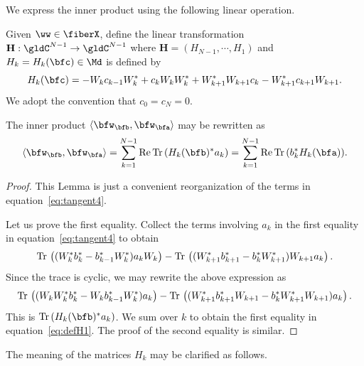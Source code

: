 We express the inner product using the following linear operation.
\begin{defn}
\label{def:H}
Given $\ww \in \fiberX$, define the linear transformation $\mathbf{H}: \gldC^{N-1} \to \gldC^{N-1}$ where $\mathbf{H} =(H_{N-1},\cdots, H_1) $ and $H_k=H_k(\bfc) \in \Md$ is defined by  
 \begin{equation}
     \label{eq:defH2}
     H_k(\bfc)= - W_k c_{k-1} W_k^* + c_k W_k W_k^*  + W^*_{k+1}W_{k+1} c_k - W^*_{k+1}c_{k+1}W_{k+1}.
 \end{equation}
 We adopt the convention that $c_0=c_N=0$.
\end{defn}
\begin{lemma}
    \label{le:defH}
The inner product $\langle \bfw_\bfb, \bfw_\bfa \rangle$ may be rewritten as
\begin{equation}
    \label{eq:defH1}
    \langle \bfw_\bfb, \bfw_\bfa \rangle = \sum_{k=1}^{N-1}\mathrm{Re} \, \Tr (H_k(\bfb)^* a_k) = \sum_{k=1}^{N-1}\mathrm{Re} \, \Tr (b_k^* H_k(\bfa)). 
\end{equation}
\end{lemma}
\begin{proof}
This Lemma is just a convenient reorganization of the terms in equation~\eqref{eq:tangent4}. 

Let us prove the first equality. Collect the terms involving $a_k$ in the first equality in equation~\eqref{eq:tangent4} to obtain 
\begin{equation}
    \label{eq:defH3}
\mathrm{Tr}\, \left( (W_k^*b_k^* - b_{k-1}^*W_k^*)a_{k}W_{k}\right) -   \mathrm{Tr}\, \left( (W_{k+1}^*b_{k+1}^* - b_{k}^* W_{k+1}^*)W_{k+1}a_{k} \right).
\end{equation}
Since the trace is cyclic, we may rewrite the above expression as
\begin{equation}
    \nonumber
\mathrm{Tr}\, \left( (W_kW_k^*b_k^* - W_kb_{k-1}^*W_k^*)a_{k}\right) -   \mathrm{Tr}\, \left( (W_{k+1}^*b_{k+1}^*W_{k+1} - b_{k}^* W_{k+1}^*W_{k+1})a_{k} \right). 
\end{equation}
This is $\Tr(H_k(\bfb)^*a_k)$. We sum over $k$ to obtain the first equality in equation~\eqref{eq:defH1}. The proof of the second equality is similar.  
\end{proof}
The meaning of the matrices $H_k$  may be clarified as follows. 
